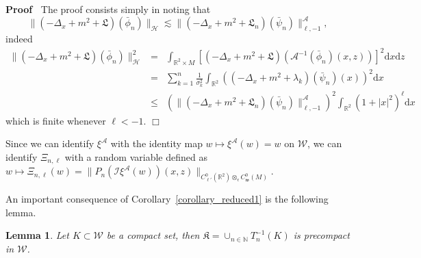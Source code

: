 \documentclass[a4paper,10pt]{article}
\newcommand{\mathd}{\mathrm{d}}
\newcommand{\nobracket}{}
\newenvironment{proof}{\noindent\textbf{Proof\ }}{\hspace*{\fill}$\Box$\medskip}
\newtheorem{lemma}[theorem]{Lemma}
\begin{document}
\begin{proof}
  The proof consists simply in noting that
  \[ \| (- \Delta_x + m^2 + \mathfrak{L}) (\bar{\phi}_n) \|_{\mathcal{H}}
     \lesssim \| (- \Delta_x + m^2 + \mathfrak{L}_n) (\bar{\psi}_n)
     \|^{\mathcal{A}}_{\ell, - 1}, \]
  indeed
  \begin{eqnarray*}
    \| (- \Delta_x + m^2 + \mathfrak{L}) (\bar{\phi}_n) \|_{\mathcal{H}}^2 & =
    & \int_{\mathbb{R}^2 \times M} [(- \Delta_x + m^2 + \mathfrak{L})
    (\mathcal{A}^{- 1} (\bar{\phi}_n) (x, z))]^2 \mathd x \mathd z\\
    & = & \sum_{k = 1}^n \frac{1}{\sigma_k^2} \int_{\mathbb{R}^2} ((-
    \Delta_x + m^2 + \lambda_k) (\bar{\psi}_n) (x))^2 \mathd x\\
    & \leqslant & (\| (- \Delta_x + m^2 + \mathfrak{L}_n) (\bar{\psi}_n)
    \|^{\mathcal{A}}_{\ell, - 1})^2 \int_{\mathbb{R}^2} (1 + | x |^2)^{\ell}
    \mathd x
  \end{eqnarray*}
  which is finite whenever $\ell < - 1$.
\end{proof}

\begin{remark}
  \label{remark_xi}Since we can identify $\xi^{\mathcal{A}}$ with the identity map $w
  \mapsto \xi^{\mathcal{A}} (w) = w$ on $\mathcal{W}$, we can identify $\Xi_{n, \ell}$ with a random
  variable defined as $w \mapsto \Xi_{n, \ell} (w) = \| P_n (\mathcal{I}
  \xi^{\mathcal{A}} (w)) (x, z) \|_{\nobracket C^0_{\ell'} (\mathbb{R}^2
  \nobracket) \otimes_{\epsilon} C^0_{\mathfrak{w}} (M)}$.
\end{remark}

An important consequence of Corollary~\ref{corollary_reduced1} is the
following lemma.

\begin{lemma}
  \label{lemma_reduced2}Let $K \subset \mathcal{W}$ be a compact set, then
  $\mathfrak{K} = \cup_{n \in \mathbb{N}} T^{- 1}_n (K)$ is precompact in
  $\mathcal{W}$.
\end{lemma}
\end{document}
